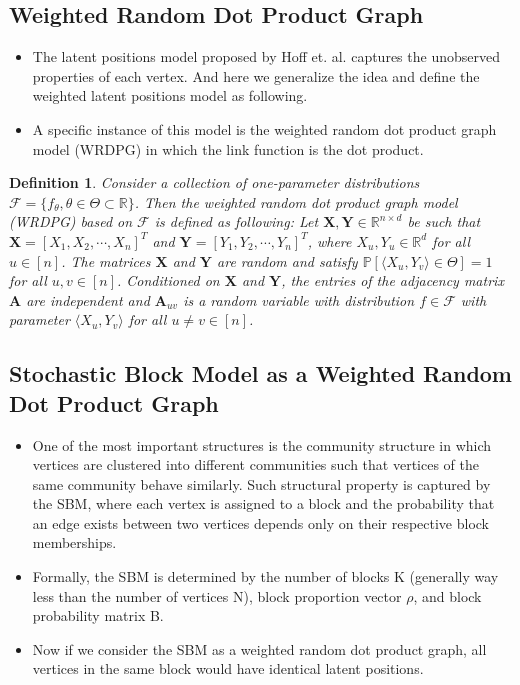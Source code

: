\documentclass[a4paper]{article}
\newtheorem{definition}[fact]{Definition}
\begin{document}
\subsection{Weighted Random Dot Product Graph}
\label{section:WRDPG}
\begin{itemize}
\item The latent positions model proposed by Hoff et. al. \cite{hoff2002latent} captures the unobserved properties of each vertex. And here we generalize the idea and define the weighted latent positions model as following.
\item A specific instance of this model is the weighted random dot product graph model (WRDPG) in which the link function is the dot product.
\end{itemize}
\begin{definition}
Consider a collection of one-parameter distributions $\mathcal{F} = \{ f_{\theta}, \theta \in \Theta \subset \mathbb{R} \}$. Then the weighted random dot product graph model (WRDPG) based on $\mathcal{F}$ is defined as following: Let $\boldsymbol{X}, \boldsymbol{Y} \in \mathbb{R}^{n \times d}$ be such that $\boldsymbol{X} = [X_1, X_2, \cdots, X_n]^T$ and $\boldsymbol{Y} = [Y_1, Y_2, \cdots, Y_n]^T$, where $X_u, Y_u \in \mathbb{R}^d$ for all $u \in [n]$. The matrices $\boldsymbol{X}$ and $\boldsymbol{Y}$ are random and satisfy $\mathbb{P}\left[ \langle X_u, Y_v \rangle \in \Theta \right] = 1$ for all $u, v \in [n]$. Conditioned on $\boldsymbol{X}$ and $\boldsymbol{Y}$, the entries of the adjacency matrix $\boldsymbol{A}$ are independent and $\boldsymbol{A}_{uv}$ is a random variable with distribution $f \in \mathcal{F}$ with parameter $\langle X_u, Y_v \rangle$ for all $u \ne v \in [n]$.
\end{definition}

\subsection{Stochastic Block Model as a Weighted Random Dot Product Graph}
\label{section:WSBM}
\begin{itemize}
\item One of the most important structures is the community structure in which vertices are clustered into different communities such that vertices of the same community behave similarly. Such structural property is captured by the SBM, where each vertex is assigned to a block and the probability that an edge exists between two vertices depends only on their respective block memberships.
\item Formally, the SBM is determined by the number of blocks K (generally way less than the number of vertices N), block proportion vector $\rho$, and block probability matrix B.
\item Now if we consider the SBM as a weighted random dot product graph, all vertices in the same block would have identical latent positions.
\end{itemize}
\end{document}
